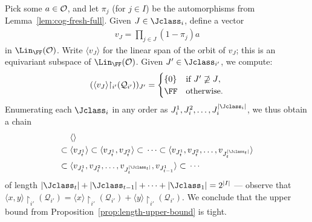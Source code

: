 Pick some $a\in \cal O$, and let $\pi_j$ (for $j \in I$) be the automorphisms from Lemma~\ref{lem:cog-fresh-full}.
Given $J \in \Jclass_i$, define a vector
\begin{align*}
    v_{J} =  \prod_{j \in J} (1 - \pi_j) a
\end{align*}
in $\Lin_\FF(\cal O)$. 
Write $\langle v_J \rangle$ for the linear span of the orbit of $v_J$; this is an equivariant subspace of $\Lin_\FF(\cal O)$.
Given $J' \in \Jclass_{i'}$, we compute:
\[
    (\langle v_{J} \rangle {\restriction_{i'}} (\mathcal{Q}_{i'}))_{J'} =
    \begin{cases}
        \{0\} & \text{if $J' \not\supseteq J$}, \\
        \FF & \text{otherwise}.
    \end{cases}
\]
Enumerating each $\Jclass_i$ in any order as $J_i^1, J_i^2, \dots, J_i^{|\Jclass_i|}$,
we thus obtain a chain
\begin{align*}
    &\langle  \rangle \\
    \subset{} &\langle v_{J_t^1} \rangle 
    \subset{} \langle v_{J_t^1}, v_{J_t^2} \rangle  
    \subset{} \cdots 
    \subset{} \langle v_{J_t^1}, v_{J_t^2}, \dots, v_{J_t^{|\Jclass_t|}} \rangle \\
    \subset{} &\langle v_{J_t^1}, v_{J_t^2}, \dots, v_{J_t^{|\Jclass_t|}}, v_{J_{t-1}^1} \rangle 
     \subset{} \cdots
\end{align*}
of length $|\Jclass_t| + |\Jclass_{t-1}| + \cdots + |\Jclass_1| = 2^{|I|}$
--- observe that $\langle x , y \rangle {\restriction_{i'}} (\mathcal{Q}_{i'}) = \langle x \rangle {\restriction_{i'}} (\mathcal{Q}_{i'}) + \langle y \rangle {\restriction_{i'}} (\mathcal{Q}_{i'})$.
We conclude that the upper bound from Proposition~\ref{prop:length-upper-bound} is tight.
